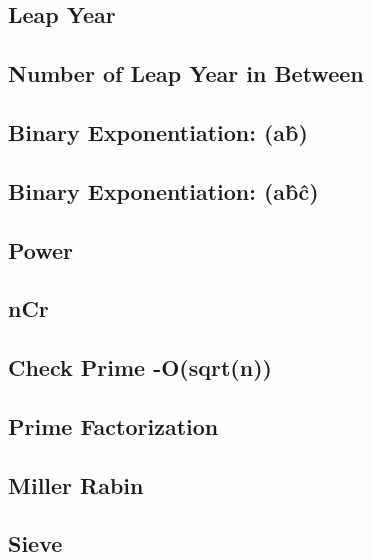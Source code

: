 \documentclass[10pt, a4paper,twocolumn]{article}
\begin{document}
\subsection{Leap Year}


\subsection{Number of Leap Year in Between}

\subsection{Binary Exponentiation: (a\^ b)}

\subsection{Binary Exponentiation: (a\^ b\^ c)}

\subsection{Power}

\subsection{nCr}


\subsection{Check Prime -O(sqrt(n))}

\subsection{Prime Factorization}

\subsection{Miller Rabin}


\subsection{Sieve}

\end{document}
